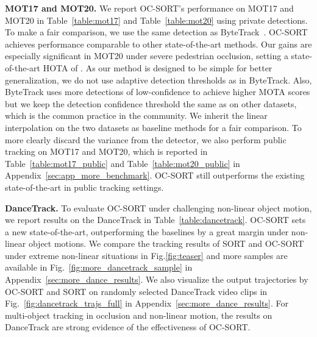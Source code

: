 \documentclass[10pt,twocolumn,letterpaper]{article}
\begin{document}
\noindent\textbf{MOT17 and MOT20.}
We report OC-SORT's performance on MOT17 and MOT20 in Table~\ref{table:mot17} and Table~\ref{table:mot20} using private detections. To make a fair comparison, we use the same detection as ByteTrack~\cite{bytetrack}. OC-SORT achieves performance comparable to other state-of-the-art methods. Our gains are especially significant in MOT20 under severe pedestrian occlusion, setting a state-of-the-art HOTA of . As our method is designed to be simple for better generalization, we do not use adaptive detection thresholds as in ByteTrack. Also, ByteTrack uses more detections of low-confidence to achieve higher MOTA scores but we keep the detection confidence threshold the same as on other datasets, which is the common practice in the community. We inherit the linear interpolation on the two datasets as baseline methods for a fair comparison. To more clearly discard the variance from the detector, we also perform public tracking on MOT17 and MOT20, which is reported in Table~\ref{table:mot17_public} and Table~\ref{table:mot20_public} in Appendix~\ref{sec:app_more_benchmark}.
OC-SORT still outperforms the existing state-of-the-art in public tracking settings. 

\noindent\textbf{DanceTrack.} To evaluate OC-SORT under challenging non-linear object motion, we report results on the DanceTrack in Table~\ref{table:dancetrack}. OC-SORT sets a new state-of-the-art, outperforming the baselines by a great margin under non-linear object motions. 
We compare the tracking results of SORT and OC-SORT under extreme non-linear situations in Fig.\ref{fig:teaser} and more samples are available in Fig.~\ref{fig:more_dancetrack_sample} in Appendix~\ref{sec:more_dance_results}. 
We also visualize the output trajectories by OC-SORT and SORT on randomly selected DanceTrack video clips in Fig.~\ref{fig:dancetrack_trajs_full} in Appendix~\ref{sec:more_dance_results}. For multi-object tracking in occlusion and non-linear motion, the results on DanceTrack are strong evidence of the effectiveness of OC-SORT.
\end{document}
